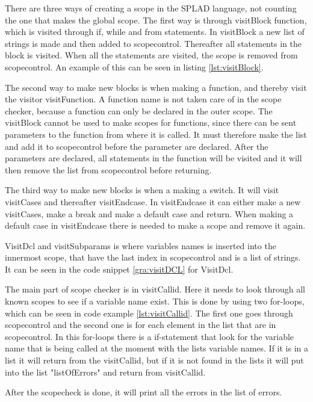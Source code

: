 There are three ways of creating a scope in the SPLAD language, not counting the one that makes the global scope. The first way is through visitBlock function, which is visited through if, while and from statements. In visitBlock a new list of strings is made and then added to scopecontrol. Thereafter all statements in the block is visited. When all the statements are visited, the scope is removed from scopecontrol. An example of this can be seen in listing \ref{lst:visitBlock}.

The second way to make new blocks is when making a function, and thereby visit the visitor visitFunction. A function name is not taken care of in the scope checker, because a function can only be declared in the outer scope. The visitBlock cannot be used to make scopes for functions, since there can be sent parameters to the function from where it is called. It must therefore make the list and add it to scopecontrol before the parameter are declared. After the parameters are declared, all statements in the function will be visited and it will then remove the list from scopecontrol before returning.

The third way to make new blocks is when a making a switch. It will visit visitCases and thereafter visitEndcase. In visitEndcase it can either make a new visitCases, make a break and make a default case and return. When making a default case in visitEndcase there is needed to make a scope and remove it again.


VisitDcl and visitSubparams is where variables names is inserted into the innermost scope, that have the last index in scopecontrol and is a list of strings. It can be seen in the code snippet \ref{gra:visitDCL} for VisitDcl.


The main part of scope checker is in visitCallid. Here it needs to look through all known scopes to see if a variable name exist. This is done by using two for-loops, which can be seen in code example \ref{lst:visitCallid}. The first one goes through scopecontrol and the second one is for each element in the list that are in scopecontrol. In this for-loops there is a if-statement that look for the variable name that is being called at the moment with the lists variable names. If it is in a list it will return from the visitCallid, but if it is not found in the lists it will put into the list "listOfErrors" and return from visitCallid.


After the scopecheck is done, it will print all the errors in the list of errors.
